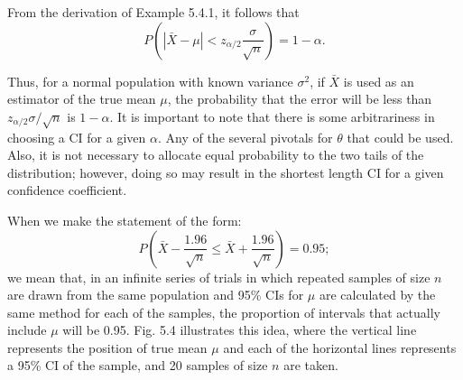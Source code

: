 From the derivation of Example 5.4.1, it follows that
\[
P\left(|\bar{X} - \mu| < z_{\alpha/2} \frac{\sigma}{\sqrt{n}}\right) = 1 - \alpha.
\]

Thus, for a normal population with known variance $\sigma^2$, if $\bar{X}$ is used as an estimator of the true mean $\mu$, the probability that the error will be less than $z_{\alpha/2} \sigma/\sqrt{n}$ is $1 - \alpha$. It is important to note that there is some arbitrariness in choosing a CI for a given $\alpha$. Any of the several pivotals for $\theta$ that could be used. Also, it is not necessary to allocate equal probability to the two tails of the distribution; however, doing so may result in the shortest length CI for a given confidence coefficient.

When we make the statement of the form:
\[
P\left(\bar{X} - \frac{1.96}{\sqrt{n}} \leq \bar{X} + \frac{1.96}{\sqrt{n}}\right) = 0.95;
\]
we mean that, in an infinite series of trials in which repeated samples of size $n$ are drawn from the same population and 95\% CIs for $\mu$ are calculated by the same method for each of the samples, the proportion of intervals that actually include $\mu$ will be 0.95. Fig. 5.4 illustrates this idea, where the vertical line represents the position of true mean $\mu$ and each of the horizontal lines represents a 95\% CI of the sample, and 20 samples of size $n$ are taken.
